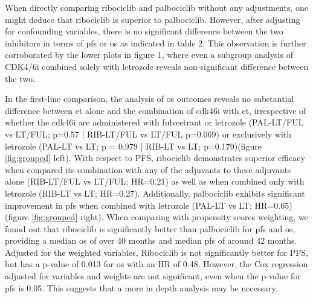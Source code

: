 When directly comparing ribociclib and palbociclib without any adjustments, one might deduce that ribociclib is superior to palbociclib. However, after adjusting for confounding variables, there is no significant difference between the two inhibitors in terms of \ac{pfs} or \ac{os} as indicated in table 2. This observation is further corroborated by the lower plots in figure 1, where even a subgroup analysis of CDK4/6i combined solely with letrozole reveals non-significant difference between the two.

In the first-line comparison, the analysis of \ac{os} outcomes reveals no substantial difference between \ac{et} alone and the combination of \ac{cdk46i} with \ac{et}, irrespective of whether the \ac{cdk46i} are administered with fulvestrant or letrozole  (PAL-LT/FUL vs LT/FUL; p=0.57 | RIB-LT/FUL vs LT/FUL p=0.069) or exclusively with letrozole (PAL-LT vs LT; p = 0.979 | RIB-LT vs LT; p=0.179)(figure \ref{fig:grouped} left). With respect to PFS, ribociclib demonstrates superior efficacy when compared its combination with any of the adjuvants to these adjuvants alone (RIB-LT/FUL vs LT/FUL; HR=0.21) as well as when combined only with letrozole (RIB-LT vs LT; HR=0.27). Additionally, palbociclib exhibits significant improvement in \ac{pfs} when combined with letrozole  (PAL-LT vs LT; HR=0.65) (figure \ref{fig:grouped} right).
When comparing with propensity scores weighting, we found out that ribociclib is significantly better than palbociclib for \ac{pfs} and \ac{os}, providing a median \ac{os} of over 40 months and median \ac{pfs} of around 42 months. Adjusted for the weighted variables, Ribociclib is not significantly better for PFS, but has a p-value of 0.013 for \ac{os} with an HR of 0.48. However, the Cox regression adjusted for variables and weights are not significant, even when the p-value for \ac{pfs} is 0.05. This suggests that a more in depth analysis may be necessary.



